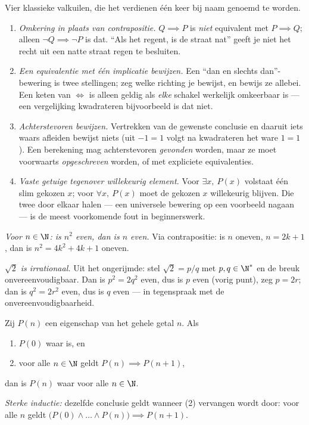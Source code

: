 \begin{remark}\label{rem:b1:logic:pitfalls}
Vier klassieke valkuilen, die het verdienen één keer bij naam genoemd te
worden.
\begin{enumerate}
  \item \emph{Omkering in plaats van contrapositie.} $Q \implies P$ is
        \emph{niet} equivalent met $P \implies Q$; alleen $\lnot Q
        \implies \lnot P$ is dat. ``Als het regent, is de straat nat''
        geeft je niet het recht uit een natte straat regen te besluiten.
  \item \emph{Een equivalentie met één implicatie bewijzen.} Een
        ``dan en slechts dan''-bewering is twee stellingen; zeg welke
        richting je bewijst, en bewijs ze allebei. Een keten van $\iff$
        is alleen geldig als \emph{elke} schakel werkelijk omkeerbaar is
        --- een vergelijking kwadrateren bijvoorbeeld is dat niet.
  \item \emph{Achterstevoren bewijzen.} Vertrekken van de gewenste
        conclusie en daaruit iets waars afleiden bewijst niets (uit
        $-1 = 1$ volgt na kwadrateren het ware $1 = 1$). Een berekening
        mag achterstevoren \emph{gevonden} worden, maar ze moet
        voorwaarts \emph{opgeschreven} worden, of met expliciete
        equivalenties.
  \item \emph{Vaste getuige tegenover willekeurig element.} Voor
        $\exists x,\ P(x)$ volstaat één slim gekozen $x$; voor
        $\forall x,\ P(x)$ moet de gekozen $x$ willekeurig blijven. Die
        twee door elkaar halen --- een universele bewering op een
        voorbeeld nagaan --- is de meest voorkomende fout in
        beginnerswerk.
\end{enumerate}
\end{remark}

\begin{example}\label{ex:b1:logic:sqrt2}
\emph{Voor $n \in \N$: is $n^2$ even, dan is $n$ even.} Via
contrapositie: is $n$ oneven, $n = 2k+1$, dan is $n^2 = 4k^2 + 4k + 1$
oneven.

\emph{$\sqrt 2$ is irrationaal.} Uit het ongerijmde: stel $\sqrt 2 = p/q$
met $p, q \in \N^*$ en de breuk onvereenvoudigbaar. Dan is $p^2 = 2q^2$
even, dus is $p$ even (vorig punt), zeg $p = 2r$; dan is $q^2 = 2r^2$
even, dus is $q$ even --- in tegenspraak met de onvereenvoudigbaarheid.
\end{example}

\begin{theorem}[Inductie]\label{thm:b1:logic:induction}
Zij $P(n)$ een eigenschap van het gehele getal $n$. Als
\begin{enumerate}
  \item $P(0)$ waar is, en
  \item voor alle $n \in \N$ geldt $P(n) \implies P(n+1)$,
\end{enumerate}
dan is $P(n)$ waar voor alle $n \in \N$.

\emph{Sterke inductie:} dezelfde conclusie geldt wanneer (2) vervangen
wordt door: voor alle $n$ geldt $\bigl(P(0) \land \dots \land
P(n)\bigr) \implies P(n+1)$.
\end{theorem}

